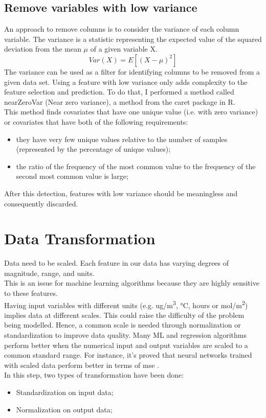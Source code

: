 \subsection{Remove variables with low variance}
An approach to remove columns is to consider the variance of each column variable. The variance is a statistic representing the expected value of the squared deviation from the mean $\mu$ of a given variable X. 
\begin{equation}
  Var(X) = E[(X-\mu)^2]
\end{equation}
The variance can be used as a filter for identifying columns to be removed from a given data set. 
Using a feature with low variance only adds complexity to the feature selection and prediction.\newline
To do that, I performed a method called nearZeroVar (Near zero variance), a method from the \gls{caret} \cite{caret} package in R.\\
This method finds covariates that have one unique value (i.e. with zero variance) or covariates that have both of the following requirements:
\begin{itemize}
\item they have very few unique values relative to the number of samples (represented by the percentage of unique values);
\item the ratio of the frequency of the most common value to the frequency of the second most common value is large;
\end{itemize}
After this detection, features with low variance should be meaningless and consequently discarded. 
\section{Data Transformation}
Data need to be scaled. Each feature in our data has varying degrees of magnitude, range, and units. \\This is an issue for machine learning algorithms because they are highly sensitive to these features.\\ 
Having input variables with different units (e.g. ug/m\textsuperscript{3}, °C, hours or mol/m\textsuperscript{2}) implies data at different scales. This could raise the difficulty of the problem being modelled. \newline
Hence, a common scale is needed through normalization or standardization to improve data quality.\newline
Many ML and regression algorithms perform better when the numerical input and output variables are scaled to a common standard range. \newline
For instance, it's proved that neural networks trained with scaled data perform better in terms of \gls{mse}  \cite{shanker1996effect}.\\
In this step, two types of transformation have been done:
\begin{itemize}
    \item Standardization on input data;
    \item Normalization on output data;
\end{itemize}
